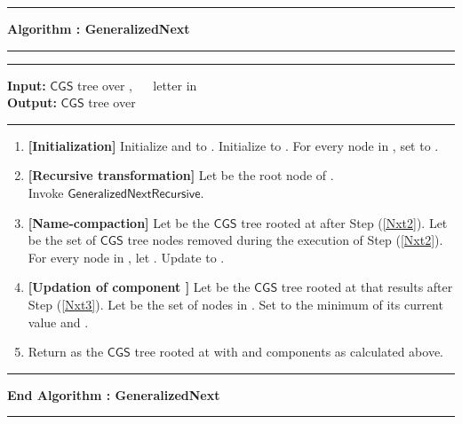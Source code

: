 \documentclass[3p]{elsarticle}
\newcommand{\CGS}{\ensuremath{\textsf{CGS }}}
\newcommand{\algo}[1]{\ensuremath{\textsf{{#1}}}}
\newcommand{\algoblock}[4]{{{{
                                     \vspace{5mm}
                                     \hrule 
				     \vspace{2mm} 
                                     \noindent \textsf{\bfseries Algorithm : {#1}}
				     \vspace{2mm} 
                                     \hrule 
				     \vspace{2mm}
                                     \hrule 
				     \vspace{2mm}
                                     \noindent \textsf{ {\bfseries Input:} {#2}}\\
                                     \noindent \textsf{ {\bfseries Output:} {#3}}
				     \vspace{2mm}
				     \hrule
				     \vspace{2mm}
{#4} 
				     \vspace{2mm}
				     \hrule
				     \vspace{2mm}
                                     \noindent \textsf{\bfseries End Algorithm : {#1}}}
				     \vspace{2mm}
                                     \hrule 
				     \vspace{2mm}
                          }}
                         }
\begin{document}
\algoblock{GeneralizedNext}
{ \CGS tree over , ~~  letter in }
{ \CGS tree over }
{
  \begin{enumerate}

  \item \label{Nxt1} {\bfseries [Initialization]} Initialize  and
     to .  Initialize  to . For every node 
    in , set  to .
    
  \item \label{Nxt2} {\bfseries [Recursive transformation]} Let
     be the root node of .  \\Invoke 
    \algo{GeneralizedNextRecursive}.
    
  \item \label{Nxt3} {\bfseries [Name-compaction]} Let 
    be the \CGS tree rooted at  after Step
    (\ref{Nxt2}).  Let  be the set of \CGS tree nodes removed
    during the execution of Step (\ref{Nxt2}).  For every node  in
    , let  .  Update  to .


  \item \label{Nxt4} {\bfseries [Updation of component ]} Let
     be the \CGS tree rooted at  that
    results after Step (\ref{Nxt3}).  Let  be the set
    of nodes in .  Set  to the minimum of its
    current value and .
  
  \item Return  as the \CGS tree rooted at  with
     and  components as calculated above.
  \end{enumerate}
}
\end{document}
